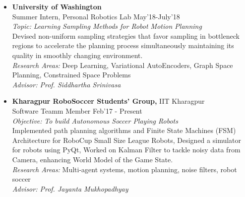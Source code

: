 \documentclass[a4paper,8pt]{article}
\begin{document}
\begin{itemize}
\item \textbf{University of Washington} \\
\small{Summer Intern, Personal Robotics Lab} \hfill \small{May'18-July'18}  \\
\textit{Topic: } \textit{Learning Sampling Methods for Robot Motion Planning} \\
\small{Devised non-uniform sampling strategies that favor sampling in bottleneck regions to accelerate
the planning process simultaneously maintaining its quality in smoothly changing environment.} \\
\textit{Research Areas: } \small{Deep Learning, Variational AutoEncoders, Graph Space Planning, Constrained Space Problems} \\
\textit{Advisor: Prof. Siddhartha Srinivasa}

\item \textbf{Kharagpur RoboSoccer Students' Group,} \small{ IIT Kharagpur} \\
\small{Software Teamm Member} \hfill \small{Feb'17 - Present}\\
\textit{Objective: } \textit{To build Autonomous Soccer Playing Robots} \\
\small{Implemented path planning algorithms and Finite State Machines (FSM) Architecture for RoboCup Small Size League Robots, Designed a simulator for
robots using PyQt, Worked on Kalman Filter to tackle noisy data from Camera, enhancing World Model of the Game State.} \\
\textit{Research Areas: } \small{Multi-agent systems, motion planning, noise filters, robot soccer} \\
\textit{Advisor: Prof. Jayanta Mukhopadhyay} 
\end{itemize}
\end{document}
